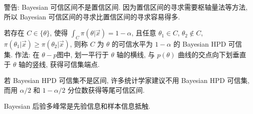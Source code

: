 警告: Bayesian 可信区间不是置信区间. 因为置信区间的寻求需要枢轴量法等方法, 所以 Bayesian 可信区间的寻求比置信区间的寻求容易得多.

若存在 $C\in\{\theta\}$, 使得 $\int_{C}\pi(\theta|\vec{x})=1-\alpha$, 且任意 $\theta_1\in C$, $\theta_2\notin C$, $\pi(\theta_1|\vec{x})\ge\pi(\theta_2|\vec{x})$, 则称 $C$ 为 $\theta$ 的可信水平为 $1-\alpha$ 的 Bayesian HPD 可信集. 作法: 在 $\theta-p$图中, 划一平行于 $\theta$ 轴的横线, 与 $p(\theta)$ 曲线的交点向下划垂直于 $\theta$ 轴的竖线, 获得可信集端点.

若 Bayesian HPD 可信集不是区间, 许多统计学家建议不用 Bayesian HPD 可信集, 而用 $\alpha/2$ 和 $1-\alpha/2$ 分位数获得等尾可信区间.

Bayesian 后验多峰常是先验信息和样本信息抵触.
